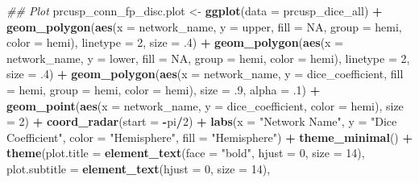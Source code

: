 \documentclass[
]{article}
\newenvironment{Shaded}{\begin{snugshade}}{\end{snugshade}}
\newcommand{\CommentTok}[1]{\textcolor[rgb]{0.56,0.35,0.01}{\textit{#1}}}
\newcommand{\DataTypeTok}[1]{\textcolor[rgb]{0.13,0.29,0.53}{#1}}
\newcommand{\DecValTok}[1]{\textcolor[rgb]{0.00,0.00,0.81}{#1}}
\newcommand{\FloatTok}[1]{\textcolor[rgb]{0.00,0.00,0.81}{#1}}
\newcommand{\KeywordTok}[1]{\textcolor[rgb]{0.13,0.29,0.53}{\textbf{#1}}}
\newcommand{\NormalTok}[1]{#1}
\newcommand{\OperatorTok}[1]{\textcolor[rgb]{0.81,0.36,0.00}{\textbf{#1}}}
\newcommand{\OtherTok}[1]{\textcolor[rgb]{0.56,0.35,0.01}{#1}}
\newcommand{\StringTok}[1]{\textcolor[rgb]{0.31,0.60,0.02}{#1}}
\begin{document}
\begin{Shaded}
\begin{Highlighting}[]
{{\CommentTok{## Plot }
\NormalTok{prcusp_conn_fp_disc.plot <-}\StringTok{ }\KeywordTok{ggplot}\NormalTok{(}\DataTypeTok{data =}\NormalTok{ prcusp_dice_all) }\OperatorTok{+}\StringTok{ }
\StringTok{   }\KeywordTok{geom_polygon}\NormalTok{(}\KeywordTok{aes}\NormalTok{(}\DataTypeTok{x =}\NormalTok{ network_name, }\DataTypeTok{y =}\NormalTok{ upper, }\DataTypeTok{fill =} \OtherTok{NA}\NormalTok{, }\DataTypeTok{group =}\NormalTok{ hemi, }\DataTypeTok{color =}\NormalTok{ hemi), }
               \DataTypeTok{linetype =} \DecValTok{2}\NormalTok{, }\DataTypeTok{size =} \FloatTok{.4}\NormalTok{) }\OperatorTok{+}\StringTok{ }
\StringTok{  }\KeywordTok{geom_polygon}\NormalTok{(}\KeywordTok{aes}\NormalTok{(}\DataTypeTok{x =}\NormalTok{ network_name, }\DataTypeTok{y =}\NormalTok{ lower, }\DataTypeTok{fill =} \OtherTok{NA}\NormalTok{, }\DataTypeTok{group =}\NormalTok{ hemi, }\DataTypeTok{color =}\NormalTok{ hemi), }
               \DataTypeTok{linetype =} \DecValTok{2}\NormalTok{, }\DataTypeTok{size =} \FloatTok{.4}\NormalTok{) }\OperatorTok{+}
\StringTok{  }\KeywordTok{geom_polygon}\NormalTok{(}\KeywordTok{aes}\NormalTok{(}\DataTypeTok{x =}\NormalTok{ network_name, }\DataTypeTok{y =}\NormalTok{ dice_coefficient, }\DataTypeTok{fill =}\NormalTok{ hemi, }\DataTypeTok{group =}\NormalTok{ hemi, }\DataTypeTok{color =}\NormalTok{ hemi), }
               \DataTypeTok{size =} \FloatTok{.9}\NormalTok{, }\DataTypeTok{alpha =} \FloatTok{.1}\NormalTok{) }\OperatorTok{+}
\StringTok{  }\KeywordTok{geom_point}\NormalTok{(}\KeywordTok{aes}\NormalTok{(}\DataTypeTok{x =}\NormalTok{ network_name, }\DataTypeTok{y =}\NormalTok{ dice_coefficient, }\DataTypeTok{color =}\NormalTok{ hemi), }\DataTypeTok{size =} \DecValTok{2}\NormalTok{) }\OperatorTok{+}\StringTok{ }
\StringTok{  }\KeywordTok{coord_radar}\NormalTok{(}\DataTypeTok{start =} \OperatorTok{-}\NormalTok{pi}\OperatorTok{/}\DecValTok{2}\NormalTok{) }\OperatorTok{+}
\StringTok{  }\KeywordTok{labs}\NormalTok{(}\DataTypeTok{x =} \StringTok{"Network Name"}\NormalTok{,}
       \DataTypeTok{y =} \StringTok{"Dice Coefficient"}\NormalTok{, }
       \DataTypeTok{color =} \StringTok{"Hemisphere"}\NormalTok{,}
       \DataTypeTok{fill =} \StringTok{"Hemisphere"}\NormalTok{) }\OperatorTok{+}\StringTok{  }
\StringTok{  }\KeywordTok{theme_minimal}\NormalTok{() }\OperatorTok{+}
\StringTok{   }\KeywordTok{theme}\NormalTok{(}\DataTypeTok{plot.title =} \KeywordTok{element_text}\NormalTok{(}\DataTypeTok{face =} \StringTok{"bold"}\NormalTok{, }\DataTypeTok{hjust =} \DecValTok{0}\NormalTok{, }\DataTypeTok{size =} \DecValTok{14}\NormalTok{), }
        \DataTypeTok{plot.subtitle =} \KeywordTok{element_text}\NormalTok{(}\DataTypeTok{hjust =} \DecValTok{0}\NormalTok{, }\DataTypeTok{size =} \DecValTok{14}\NormalTok{),}
}}
\end{Highlighting}
\end{Shaded}
\end{document}
